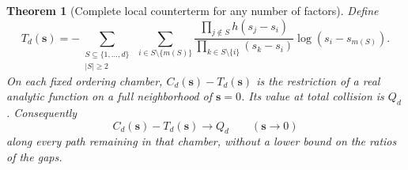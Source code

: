 \documentclass[11pt]{article}
\numberwithin{equation}{section}
\newtheorem{theorem}{Theorem}[section]
\theoremstyle{definition}
\theoremstyle{remark}
\begin{document}
\begin{theorem}[Complete local counterterm for any number of factors]
\label{gc:main}
Define
\begin{equation}\label{gc:T}
 T_d(\boldsymbol{s})=
 -\sum_{\substack{S\subseteq\{1,\ldots,d\}\\ |S|\ge2}}
  \ \sum_{i\in S\setminus\{m(S)\}}
  \frac{\displaystyle\prod_{j\notin S}h(s_j-s_i)}
       {\displaystyle\prod_{k\in S\setminus\{i\}}(s_k-s_i)}
       \log(s_i-s_{m(S)}).
\end{equation}
On each fixed ordering chamber,
$C_d(\boldsymbol{s})-T_d(\boldsymbol{s})$ is the restriction of a real
analytic function on a full neighborhood of $\boldsymbol{s}=0$.  Its value
at total collision is $Q_d$.  Consequently
\begin{equation}\label{gc:anypath}
 C_d(\boldsymbol{s})-T_d(\boldsymbol{s})\longrightarrow Q_d
 \qquad (\boldsymbol{s}\longrightarrow0)
\end{equation}
along every path remaining in that chamber, without a lower bound on the
ratios of the gaps.
\end{theorem}
\end{document}
